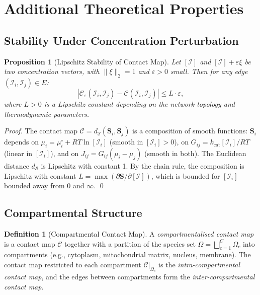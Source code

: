 \documentclass[11pt,twocolumn]{article}
\theoremstyle{plain}
\newtheorem{proposition}[theorem]{Proposition}
\theoremstyle{definition}
\newtheorem{definition}[theorem]{Definition}
\newcommand{\CC}{\mathcal{C}}
\newcommand{\bS}{\mathbf{S}}
\newcommand{\dS}{d_{\mathcal{S}}}
\newcommand{\eps}{\varepsilon}
\begin{document}
\section{Additional Theoretical Properties}
\label{sec:properties}

\subsection{Stability Under Concentration Perturbation}

\begin{proposition}[Lipschitz Stability of Contact Map]
\label{prop:stability}
Let $[\mathcal{I}]$ and $[\mathcal{I}] + \eps \xi$ be two concentration vectors,
with $\|\xi\|_2 = 1$ and $\eps > 0$ small. Then for any edge
$(\mathcal{I}_i, \mathcal{I}_j) \in E$:
\begin{equation}
  |\CC_\eps(\mathcal{I}_i, \mathcal{I}_j)
  - \CC(\mathcal{I}_i, \mathcal{I}_j)|
  \leq L \cdot \eps,
\end{equation}
where $L > 0$ is a Lipschitz constant depending on the network topology and
thermodynamic parameters.
\end{proposition}

\begin{proof}
The contact map $\CC = \dS(\bS_i, \bS_j)$ is a composition of smooth functions:
$\bS_i$ depends on $\mu_i = \mu_i^\circ + RT \ln[\mathcal{I}_i]$ (smooth in
$[\mathcal{I}_i] > 0$), on $G_{ij} = k_{\text{cat}} [\mathcal{I}_i] / RT$
(linear in $[\mathcal{I}_i]$), and on $J_{ij} = G_{ij}(\mu_i - \mu_j)$ (smooth
in both). The Euclidean distance $\dS$ is Lipschitz with constant 1. By the
chain rule, the composition is Lipschitz with constant $L = \max(\partial \bS /
\partial [\mathcal{I}])$, which is bounded for $[\mathcal{I}_i]$ bounded away
from 0 and $\infty$. \qed
\end{proof}

\subsection{Compartmental Structure}

\begin{definition}[Compartmental Contact Map]
\label{def:compartmental}
A \emph{compartmentalised contact map} is a contact map $\CC$ together with a
partition of the species set $\Omega = \bigsqcup_{c=1}^C \Omega_c$ into
compartments (e.g., cytoplasm, mitochondrial matrix, nucleus, membrane).
The contact map restricted to each compartment $\CC|_{\Omega_c}$ is the
\emph{intra-compartmental contact map}, and the edges between compartments
form the \emph{inter-compartmental contact map}.
\end{definition}
\end{document}
